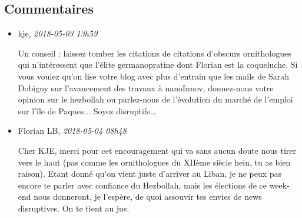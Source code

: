 \hypertarget{commentaires}{%
\subsection{Commentaires}\label{commentaires}}

\begin{itemize}
\item
  kje, \emph{2018-05-03 13h59}

  Un conseil : laissez tomber les citations de citations d'obscurs
  ornithologues qui n'intéressent que l'élite germanopratine dont
  Florian est la coqueluche. Si vous voulez qu'on lise votre blog avec
  plus d'entrain que les mails de Sarah Dobigny sur l'avancement des
  travaux à nanoInnov, donnez-nous votre opinion sur le hezbollah ou
  parlez-nous de l'évolution du marché de l'emploi sur l'île de
  Paques... Soyez disruptifs...
\item
  Florian LB, \emph{2018-05-04 08h48}

  Cher KJE, merci pour cet encouragement qui va sans aucun doute nous
  tirer vers le haut (pas comme les ornithologues du XIIème siècle hein,
  tu as bien raison). Etant donné qu'on vient juste d'arriver au Liban,
  je ne peux pas encore te parler avec confiance du Hezbollah, mais les
  élections de ce week-end nous donneront, je l'espère, de quoi assouvir
  tes envies de news disruptives. On te tient au jus.
\end{itemize}

